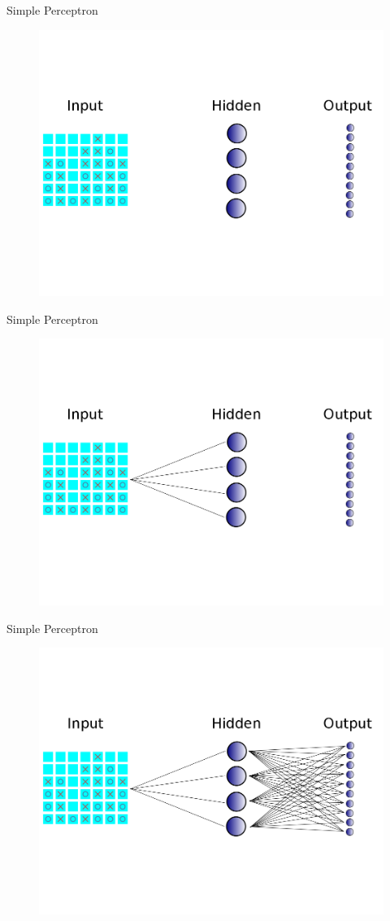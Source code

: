 \begin{frame}{Simple Perceptron}
\begin{figure}
\includegraphics[width=0.8 \textwidth]{"simple neural net no lines"}
\end{figure}
\end{frame}

\begin{frame}{Simple Perceptron}
\begin{figure}
\includegraphics[width=0.8 \textwidth]{"simple neural net half lines"}
\end{figure}
\end{frame}

\begin{frame}{Simple Perceptron}
\begin{figure}
\includegraphics[width=0.8 \textwidth]{"simple neural net all lines"}
\end{figure}
\end{frame}

